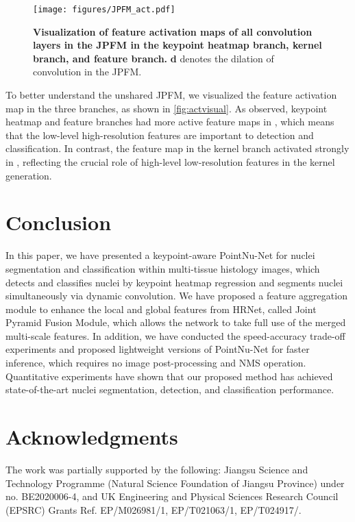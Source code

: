 \documentclass[lettersize,journal]{IEEEtran}
\begin{document}
\begin{figure}[t]
\centering
\texttt{[image: figures/JPFM\_act.pdf]}
\caption{\textbf{Visualization of feature activation maps of all convolution layers in the JPFM in the keypoint heatmap branch, kernel branch, and feature branch.} \textbf{d} denotes the dilation of convolution in the JPFM. }
\label{fig:actvisual}
\end{figure}
To better understand the unshared JPFM, we visualized the feature activation map in the three branches, as shown in \autoref{fig:actvisual}. As observed, keypoint heatmap and feature branches had more active feature maps in , which means that the low-level high-resolution features are important to detection and classification. In contrast, the feature map in the kernel branch activated strongly in , reflecting the crucial role of high-level low-resolution features in the kernel generation.

\section{Conclusion}
In this paper, we have presented a keypoint-aware PointNu-Net for nuclei segmentation and classification within multi-tissue histology images, which detects and classifies nuclei by keypoint heatmap regression and segments nuclei simultaneously via dynamic convolution. 
We have proposed a feature aggregation module to enhance the local and global features from HRNet, called Joint Pyramid Fusion Module, which allows the network to take full use of the merged multi-scale features. In addition, we have conducted the speed-accuracy trade-off experiments and proposed lightweight versions of PointNu-Net for faster inference, which requires no image post-processing and NMS operation. 
Quantitative experiments have shown that our proposed method has achieved state-of-the-art nuclei segmentation, detection, and classification performance.



\section*{Acknowledgments}
The work was partially supported by the following: Jiangsu Science and Technology Programme (Natural Science Foundation of Jiangsu Province) under no. BE2020006-4, and UK Engineering and Physical Sciences Research Council (EPSRC) Grants Ref. EP/M026981/1, EP/T021063/1, EP/T024917/.


\end{document}
